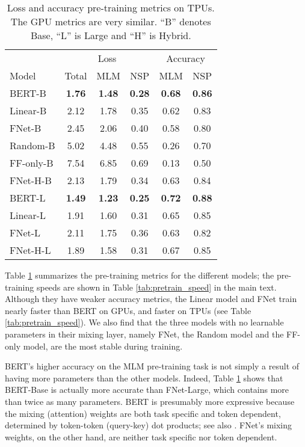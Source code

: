 \documentclass[11pt]{article}
\begin{document}
\begin{table}
    \caption{Loss and accuracy pre-training metrics on TPUs. The GPU metrics are very similar. ``B'' denotes Base, ``L'' is Large and ``H'' is Hybrid.}
    \label{tab:pretraining_metrics}
    \setlength{\tabcolsep}{4.5pt}
    \centering
    \begin{tabular}{l| c c c | c c}
        \hline
         & \multicolumn{3}{c|}{Loss} & \multicolumn{2}{c}{Accuracy} \\ 
         Model & Total & MLM & NSP & MLM & NSP \\ \hline \hline
         BERT-B & \textbf{1.76} & \textbf{1.48} & \textbf{0.28} & \textbf{0.68} & \textbf{0.86} \\ 
         Linear-B & 2.12 & 1.78 & 0.35 & 0.62 & 0.83 \\ 
         FNet-B & 2.45 & 2.06 & 0.40 & 0.58 & 0.80 \\
         Random-B & 5.02 & 4.48 & 0.55 & 0.26 & 0.70 \\ 
         FF-only-B & 7.54 & 6.85 & 0.69 & 0.13 & 0.50 \\
         FNet-H-B & 2.13 & 1.79 & 0.34 & 0.63 & 0.84 \\ \hline
         BERT-L & \textbf{1.49} & \textbf{1.23} & \textbf{0.25} & \textbf{0.72} & \textbf{0.88} \\ 
         Linear-L & 1.91 & 1.60 & 0.31 & 0.65 & 0.85 \\ 
         FNet-L & 2.11 & 1.75 & 0.36 & 0.63 & 0.82 \\
         FNet-H-L & 1.89 & 1.58 & 0.31 & 0.67 & 0.85 \\\hline
    \end{tabular}
\end{table}


Table \ref{tab:pretraining_metrics} summarizes the pre-training metrics for the different models; the pre-training speeds are shown in Table \ref{tab:pretrain_speed} in the main text. Although they have weaker accuracy metrics, the Linear model and FNet train nearly  faster than BERT on GPUs, and  faster on TPUs (see Table \ref{tab:pretrain_speed}).  We also find that the three models with no learnable parameters in their mixing layer, namely FNet, the  Random model and the FF-only model, are the most stable during training.

BERT's higher accuracy on the MLM pre-training task is not simply a result of having more parameters than the other models. Indeed, Table \ref{tab:pretraining_metrics} shows that BERT-Base is actually more accurate than FNet-Large, which contains more than twice as many parameters. BERT is presumably more expressive because the mixing (attention) weights are both task specific and token dependent, determined by token-token (query-key) dot products; see also \citet{tay2020synthesizer}. FNet's mixing weights, on the other hand, are neither task specific nor token dependent.
\end{document}
